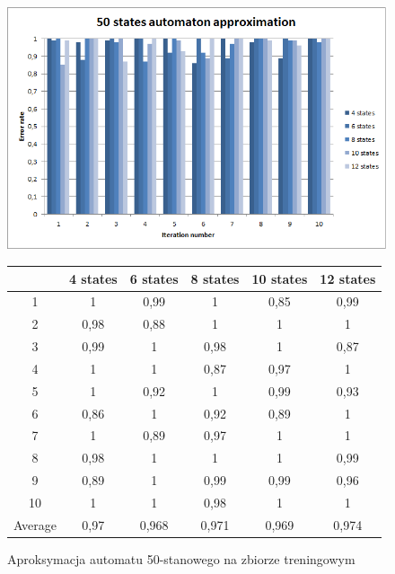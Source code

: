\documentclass[runningheads,a4paper]{llncs}
\begin{document}
\begin{figure}[!htb]
\includegraphics[scale=0.92]{9.png}
\endminipage\hfill
\hspace{2.2cm}
\renewcommand{\arraystretch}{1.3}%
\begin{tabular}{@{}cccccc@{}}
\toprule
        & 4 states & 6 states & 8 states & 10 states & 12 states    \\ \midrule
1       & 1        & 0,99     & 1        & 0,85      & 0,99 \\
2       & 0,98     & 0,88     & 1        & 1         & 1 \\
3       & 0,99     & 1        & 0,98     & 1         & 0,87 \\
4       & 1        & 1        & 0,87     & 0,97      & 1   \\
5       & 1        & 0,92     & 1        & 0,99      & 0,93   \\
6       & 0,86     & 1        & 0,92     & 0,89      & 1    \\
7       & 1        & 0,89     & 0,97     & 1         & 1    \\
8       & 0,98     & 1        & 1        & 1         & 0,99    \\
9       & 0,89     & 1        & 0,99     & 0,99      & 0,96 \\
10      & 1        & 1        & 0,98     & 1         & 1  \\ \bottomrule
Average & 0,97    & 0,968     & 0,971    & 0,969     & 0,974  \\ \bottomrule
\end{tabular}
\vspace{4mm}
\endminipage\hfill
\caption{Aproksymacja automatu 50-stanowego na zbiorze treningowym}
\end{figure}
\end{document}
